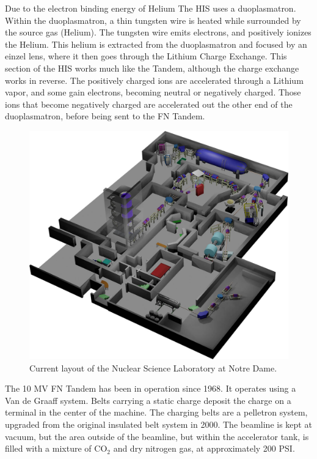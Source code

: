 Due to the electron binding energy of Helium The HIS uses a duoplasmatron. Within the duoplasmatron, a thin tungsten wire is heated while surrounded by the source gas (Helium). The tungsten wire emits electrons, and positively ionizes the Helium. This helium is extracted from the duoplasmatron and focused by an einzel lens, where it then goes through the Lithium Charge Exchange. This section of the HIS works much like the Tandem, although the charge exchange works in reverse. The positively charged ions are accelerated through a Lithium vapor, and some gain electrons, becoming neutral or negatively charged. Those ions that become negatively charged are accelerated out the other end of the duoplasmatron, before being sent to the FN Tandem.

\begin{figure}
    \centering
    \includegraphics[scale=0.25]{Setup_Figs/NSL_2018_Layout.png}
    \caption{Current layout of the Nuclear Science Laboratory at Notre Dame.}
    \label{fig:NSL}
\end{figure}

The 10 MV FN Tandem has been in operation since 1968. It operates using a Van de Graaff system. Belts carrying a static charge deposit the charge on a terminal in the center of the machine. The charging belts are a pelletron system, upgraded from the original insulated belt system in 2000. The beamline is kept at vacuum, but the area outside of the beamline, but within the accelerator tank, is filled with a mixture of CO$_2$ and dry nitrogen gas, at approximately 200 PSI.

